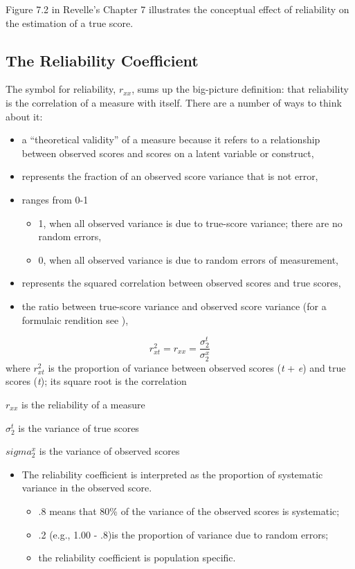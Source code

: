 \documentclass[
  english,
]{book}
\providecommand{\tightlist}{%
  \setlength{\itemsep}{0pt}\setlength{\parskip}{0pt}}
\begin{document}
Figure 7.2 in Revelle's Chapter 7 \citeyearpar{revelle_introduction_nodate} illustrates the conceptual effect of reliability on the estimation of a true score.

\hypertarget{the-reliability-coefficient}{%
\subsection{The Reliability Coefficient}\label{the-reliability-coefficient}}

The symbol for reliability, \(r_{xx}\), sums up the big-picture definition: that reliability is the correlation of a measure with itself. There are a number of ways to think about it:

\begin{itemize}
\tightlist
\item
  a ``theoretical validity'' of a measure because it refers to a relationship between observed scores and scores on a latent variable or construct,
\item
  represents the fraction of an observed score variance that is not error,
\item
  ranges from 0-1

  \begin{itemize}
  \tightlist
  \item
    1, when all observed variance is due to true-score variance; there are no random errors,
  \item
    0, when all observed variance is due to random errors of measurement,
  \end{itemize}
\item
  represents the squared correlation between observed scores and true scores,
\item
  the ratio between true-score variance and observed score variance (for a formulaic rendition see \citep{pedhazur_measurement_1991}),
\end{itemize}

\[r_{xt}^{2}=r_{xx} =\frac{\sigma_{2}^{t}}{\sigma_{2}^{x}}\]
where
\(r_{xt}^{2}\) is the proportion of variance between observed scores (\emph{t} + \emph{e}) and true scores (\emph{t}); its square root is the correlation

\(r_{xx}\) is the reliability of a measure

\({\sigma_{2}^{t}}\) is the variance of true scores

\(sigma_{2}^{x}\) is the variance of observed scores

\begin{itemize}
\tightlist
\item
  The reliability coefficient is interpreted as the proportion of systematic variance in the observed score.

  \begin{itemize}
  \tightlist
  \item
    .8 means that 80\% of the variance of the observed scores is systematic;
  \item
    .2 (e.g., 1.00 - .8)is the proportion of variance due to random errors;
  \item
    the reliability coefficient is population specific.
  \end{itemize}
\end{itemize}
\end{document}
